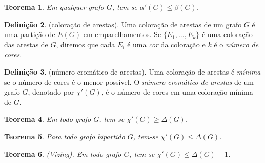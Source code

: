 \documentclass{article}
\theoremstyle{plain}
\newtheorem{thm}{Teorema}[section]
\theoremstyle{definition}
\newtheorem{defn}[thm]{Definição}
\theoremstyle{remark}
\begin{document}
\begin{thm}
    Em qualquer grafo \(G\), tem-se \(\alpha'(G) \leq \beta(G)\).
\end{thm}

\begin{defn} (coloração de arestas).
    Uma coloração de arestas de um grafo \(G\) é uma partição de \(E(G)\) em emparelhamentos. Se \(\{E_1, \ldots, E_k\}\) é uma coloração das arestas de \(G\), diremos que cada \(E_i\) é uma \emph{cor} da coloração e \(k\) é o \emph{número de cores}.
\end{defn}

\begin{defn} (número cromático de arestas).
    Uma coloração de arestas é \emph{mínima} se o número de cores é o menor possível. O \emph{número cromático de arestas} de um grafo \(G\), denotado por \(\chi'(G)\), é o número de cores em uma coloração mínima de \(G\).
\end{defn}

\begin{thm}
    Em todo grafo \(G\), tem-se \(\chi'(G) \geq \Delta(G)\).
\end{thm}

\begin{thm}
    Para todo grafo bipartido \(G\), tem-se \(\chi'(G) \leq \Delta(G)\).
\end{thm}

\begin{thm} (Vizing).
    Em todo grafo \(G\), tem-se \(\chi'(G) \leq \Delta(G) + 1\).
\end{thm}
\end{document}
